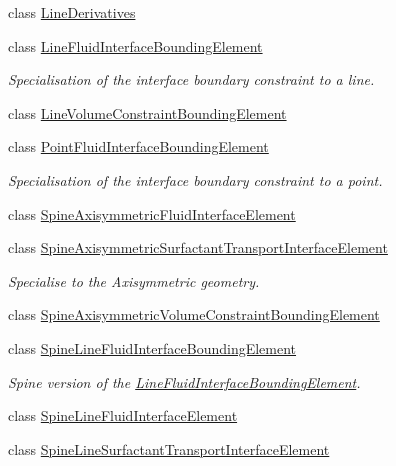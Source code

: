 \begin{DoxyCompactItemize}
\item 
class \hyperlink{classoomph_1_1LineDerivatives}{Line\+Derivatives}
\item 
class \hyperlink{classoomph_1_1LineFluidInterfaceBoundingElement}{Line\+Fluid\+Interface\+Bounding\+Element}
\begin{DoxyCompactList}\small\item\em Specialisation of the interface boundary constraint to a line. \end{DoxyCompactList}\item 
class \hyperlink{classoomph_1_1LineVolumeConstraintBoundingElement}{Line\+Volume\+Constraint\+Bounding\+Element}
\item 
class \hyperlink{classoomph_1_1PointFluidInterfaceBoundingElement}{Point\+Fluid\+Interface\+Bounding\+Element}
\begin{DoxyCompactList}\small\item\em Specialisation of the interface boundary constraint to a point. \end{DoxyCompactList}\item 
class \hyperlink{classoomph_1_1SpineAxisymmetricFluidInterfaceElement}{Spine\+Axisymmetric\+Fluid\+Interface\+Element}
\item 
class \hyperlink{classoomph_1_1SpineAxisymmetricSurfactantTransportInterfaceElement}{Spine\+Axisymmetric\+Surfactant\+Transport\+Interface\+Element}
\begin{DoxyCompactList}\small\item\em Specialise to the Axisymmetric geometry. \end{DoxyCompactList}\item 
class \hyperlink{classoomph_1_1SpineAxisymmetricVolumeConstraintBoundingElement}{Spine\+Axisymmetric\+Volume\+Constraint\+Bounding\+Element}
\item 
class \hyperlink{classoomph_1_1SpineLineFluidInterfaceBoundingElement}{Spine\+Line\+Fluid\+Interface\+Bounding\+Element}
\begin{DoxyCompactList}\small\item\em Spine version of the \hyperlink{classoomph_1_1LineFluidInterfaceBoundingElement}{Line\+Fluid\+Interface\+Bounding\+Element}. \end{DoxyCompactList}\item 
class \hyperlink{classoomph_1_1SpineLineFluidInterfaceElement}{Spine\+Line\+Fluid\+Interface\+Element}
\item 
class \hyperlink{classoomph_1_1SpineLineSurfactantTransportInterfaceElement}{Spine\+Line\+Surfactant\+Transport\+Interface\+Element}

\end{DoxyCompactItemize}

